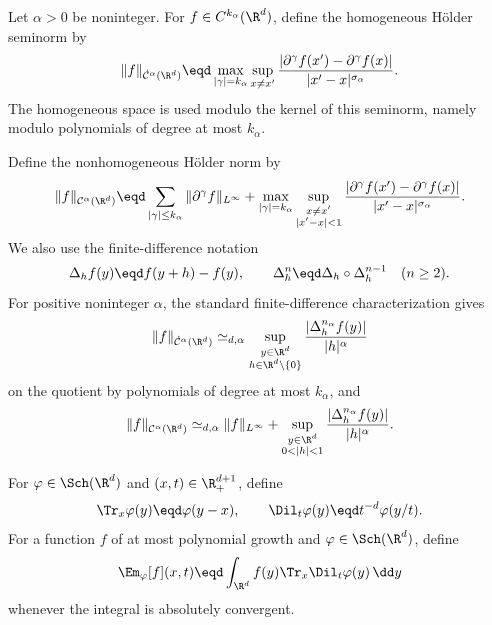 \begin{definition}\label{def:holder-spaces}
  Let \(\alpha > 0\) be noninteger. For
  \(f \in C^{k_{\alpha}}(\R^d)\), define the homogeneous H{\"o}lder seminorm by
  \begin{equation}
    \label{eq:holder-homogeneous-seminorm}
    \|f\|_{\dot{\mathcal{C}}^{\alpha}(\R^d)}
    \eqd
    \max_{|\gamma| = k_{\alpha}}
    \sup_{x \neq x'}
    \frac{
      |\partial^{\gamma} f(x') - \partial^{\gamma} f(x)|
    }{
      |x' - x|^{\sigma_{\alpha}}
    }.
  \end{equation}
  The homogeneous space is used modulo the kernel of this seminorm, namely
  modulo polynomials of degree at most \(k_{\alpha}\).

  Define the nonhomogeneous H{\"o}lder norm by
  \begin{equation}
    \label{eq:holder-nonhomogeneous-norm}
    \|f\|_{\mathcal{C}^{\alpha}(\R^d)}
    \eqd
    \sum_{|\gamma| \le k_{\alpha}}
    \|\partial^{\gamma} f\|_{L^{\infty}}
    +
    \max_{|\gamma| = k_{\alpha}}
    \sup_{\substack{x \neq x'\\ |x' - x| < 1}}
    \frac{
      |\partial^{\gamma} f(x') - \partial^{\gamma} f(x)|
    }{
      |x' - x|^{\sigma_{\alpha}}
    }.
  \end{equation}
  We also use the finite-difference notation
  \[
    \Delta_h f(y) \eqd f(y + h) - f(y),
    \qquad
    \Delta_h^n \eqd \Delta_h \circ \Delta_h^{n - 1}
    \quad (n \ge 2).
  \]
  For positive noninteger \(\alpha\), the standard finite-difference
  characterization gives
  \begin{equation}
    \label{eq:holder-homogeneous-finite-difference}
    \|f\|_{\dot{\mathcal{C}}^{\alpha}(\R^d)}
    \simeq_{d, \alpha}
    \sup_{\substack{y \in \R^d\\ h \in \R^d \setminus \{0\}}}
    \frac{|\Delta_h^{n_{\alpha}} f(y)|}{|h|^{\alpha}}
  \end{equation}
  on the quotient by polynomials of degree at most \(k_{\alpha}\), and
  \begin{equation}
    \label{eq:holder-nonhomogeneous-finite-difference}
    \|f\|_{\mathcal{C}^{\alpha}(\R^d)}
    \simeq_{d, \alpha}
    \|f\|_{L^{\infty}}
    +
    \sup_{\substack{y \in \R^d\\ 0 < |h| < 1}}
    \frac{|\Delta_h^{n_{\alpha}} f(y)|}{|h|^{\alpha}}.
  \end{equation}
\end{definition}

\begin{definition}\label{def:wavelet-coefficients}
  For \(\varphi \in \Sch(\R^d)\) and \((x, t) \in \R^{d + 1}_+\), define
  \[
    \Tr_x \varphi(y) \eqd \varphi(y - x),
    \qquad
    \Dil_t \varphi(y) \eqd t^{-d} \varphi(y/t).
  \]
  For a function \(f\) of at most polynomial growth and
  \(\varphi \in \Sch(\R^d)\), define
  \begin{equation}
    \label{eq:wavelet-coefficient-fixed-test}
    \Em_{\varphi}[f](x, t)
    \eqd
    \int_{\R^d} f(y) \Tr_x \Dil_t \varphi(y) \, \dd y
  \end{equation}
  whenever the integral is absolutely convergent.
\end{definition}

